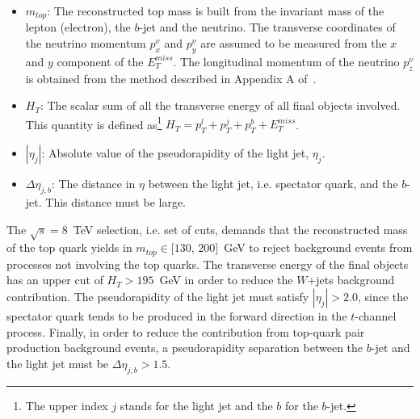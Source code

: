 \begin{itemize}
\item $m_{top}$: The reconstructed top mass is built from the invariant mass of the lepton (electron), the $b$-jet and the neutrino. The transverse coordinates of the neutrino momentum $p^{\nu}_x$ and $p^{\nu}_y$ are assumed to be measured from the $x$ and $y$ component of the $E_T^{miss}$.
The longitudinal momentum of the neutrino $p^{\nu}_z$ is obtained from the method described in Appendix A of~\cite{phdthesisSebas}.

\item $H_T$: The scalar sum of all the transverse energy of all final objects involved. This quantity is defined as\footnote{The upper index $j$ stands for the light jet and the $b$ for the $b$-jet.} $H_T=p_T^l +p_T ^{j}+p_T ^{b}+E_T^{miss}$.
\item $|\eta_j|$: Absolute value of the pseudorapidity of the light jet, $\eta_j$. %
\item$\Delta \eta_{j,b}$: The distance in $\eta$ between the light jet, i.e. spectator quark, and the $b$-jet. This distance must be large.
\end{itemize} 

The $\sqrt{s}=8$~TeV selection, i.e. set of cuts, demands that the reconstructed mass of the top quark yields in $m_{top} \in [130$, $200]$~GeV to reject background events from processes not involving the top quarks. The transverse energy of the final objects has an upper cut of $H_{T} > 195$~GeV in order to reduce the $W$+jets background contribution. The pseudorapidity of the light jet must satisfy $|\eta_j| > 2.0$, since the spectator quark tends to be produced in the forward direction in the $t$-channel process. Finally, in order to reduce the contribution from top-quark pair production background events, a pseudorapidity separation between the $b$-jet and the light jet must be $\Delta \eta_{j,b} > 1.5$.



